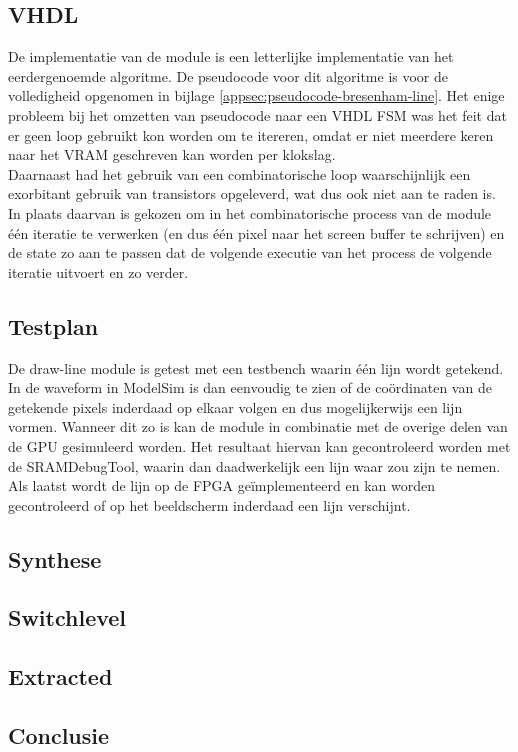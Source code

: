 \documentclass{scrartcl} %
\begin{document}
\subsection{VHDL}
De implementatie van de module is een letterlijke implementatie van het eerdergenoemde algoritme. De pseudocode voor dit algoritme is voor de volledigheid opgenomen in bijlage \ref{appsec:pseudocode-bresenham-line}. Het enige probleem bij het omzetten van pseudocode naar een VHDL FSM was het feit dat er geen loop gebruikt kon worden om te itereren, omdat er niet meerdere keren naar het VRAM geschreven kan worden per klokslag.
\\
Daarnaast had het gebruik van een combinatorische loop waarschijnlijk een exorbitant gebruik van transistors opgeleverd, wat dus ook niet aan te raden is. In plaats daarvan is gekozen om in het combinatorische process van de module één iteratie te verwerken (en dus één pixel naar het screen buffer te schrijven) en de state zo aan te passen dat de volgende executie van het process de volgende iteratie uitvoert en zo verder.

\subsection{Testplan}
De draw-line module is getest met een testbench waarin één lijn wordt getekend. In de waveform in ModelSim is dan eenvoudig te zien of de coördinaten van de getekende pixels inderdaad op elkaar volgen en dus mogelijkerwijs een lijn vormen. Wanneer dit zo is kan de module in combinatie met de overige delen van de GPU gesimuleerd worden. Het resultaat hiervan kan gecontroleerd worden met de SRAMDebugTool, waarin dan daadwerkelijk een lijn waar zou zijn te nemen. Als laatst wordt de lijn op de FPGA geïmplementeerd en kan worden gecontroleerd of op het beeldscherm inderdaad een lijn verschijnt.

\subsection{Synthese}


\subsection{Switchlevel}


\subsection{Extracted}

\subsection{Conclusie}
\end{document}
